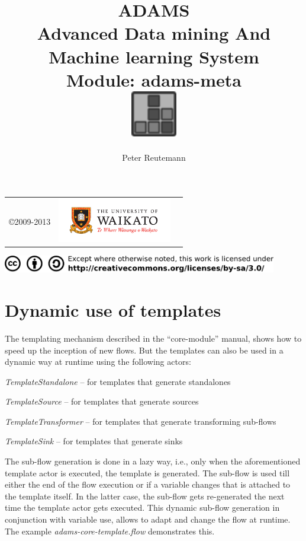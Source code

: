 \documentclass[a4paper]{book}
\title{
  \textbf{ADAMS} \\
  {\Large \textbf{A}dvanced \textbf{D}ata mining \textbf{A}nd \textbf{M}achine
  learning \textbf{S}ystem} \\
  {\Large Module: adams-meta} \\
  \vspace{1cm}
  \includegraphics[width=2cm]{images/meta-module.png} \\
}
\author{
  Peter Reutemann
}
\begin{document}
\begin{titlepage}
\maketitle

\thispagestyle{empty}
\center
\begin{table}[b]
	\begin{tabular}{c l l}
		\parbox[c][2cm]{2cm}{\copyright 2009-2013} &
		\parbox[c][2cm]{5cm}{\includegraphics[width=5cm]{images/coat_of_arms.pdf}} \\
	\end{tabular}
	\includegraphics[width=12cm]{images/cc.png} \\
\end{table}

\end{titlepage}

\tableofcontents
\listoffigures



\newpage
\chapter{Dynamic use of templates}
\label{dynamic}
The templating mechanism described in the ``core-module'' manual, shows how to 
speed up the inception of new flows. But the templates can also be used in a
dynamic way at runtime using the following actors:
\begin{tight_itemize}
	\item \textit{TemplateStandalone} -- for templates that generate standalones
	\item \textit{TemplateSource} -- for templates that generate sources
	\item \textit{TemplateTransformer} -- for templates that generate transforming
	sub-flows
	\item \textit{TemplateSink} -- for templates that generate sinks
\end{tight_itemize}
The sub-flow generation is done in a lazy way, i.e., only when the
aforementioned template actor is executed, the template is generated. The
sub-flow is used till either the end of the flow execution or if a variable
changes that is attached to the template itself. In the latter case, the
sub-flow gets re-generated the next time the template actor gets executed. This
dynamic sub-flow generation in conjunction with variable use, allows to adapt
and change the flow at runtime. The example \textit{adams-core-template.flow}
demonstrates this.
\end{document}
